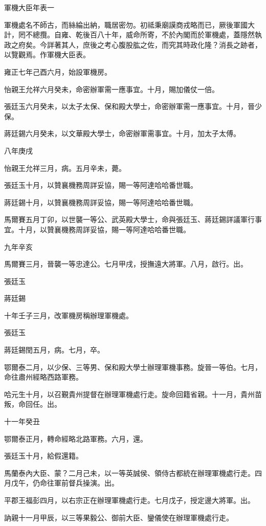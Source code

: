 
\begin{pinyinscope}
軍機大臣年表一

軍機處名不師古，而絲綸出納，職居密勿。初祗秉廟謨商戎略而已，厥後軍國大計，罔不總攬。自雍、乾後百八十年，威命所寄，不於內閣而於軍機處，蓋隱然執政之府矣。今詳著其人，庶後之考心腹股肱之佐，而究其時政化隆？消長之跡者，以覽觀焉。作軍機大臣表。

雍正七年己酉六月，始設軍機房。

怡親王允祥六月癸未，命密辦軍需一應事宜。十月，賜加儀仗一倍。

張廷玉六月癸未，以太子太保、保和殿大學士，命密辦軍需一應事宜。十月，晉少保。

蔣廷錫六月癸未，以文華殿大學士，命密辦軍需事宜。十月，加太子太傅。

八年庚戌

怡親王允祥三月，病。五月辛未，薨。

張廷玉十月，以贊襄機務周詳妥協，賜一等阿達哈哈番世職。

蔣廷錫十月，以贊襄機務周詳妥協，賜一等阿達哈哈番世職。

馬爾賽五月丁卯，以世襲一等公、武英殿大學士，命與張廷玉、蔣廷錫詳議軍行事宜。十月，以贊襄機務周詳妥協，賜一等阿達哈哈番世職。

九年辛亥

馬爾賽三月，晉襲一等忠達公。七月甲戌，授撫遠大將軍。八月，啟行。出。

張廷玉

蔣廷錫

十年壬子三月，改軍機房稱辦理軍機處。

張廷玉

蔣廷錫閏五月，病。七月，卒。

鄂爾泰二月，以少保、三等男、保和殿大學士辦理軍機事務。旋晉一等伯。七月，命往肅州經略西路軍務。

哈元生十月，以召覲貴州提督在辦理軍機處行走。旋命回籍省親。十一月，貴州苗叛，命回任。出。

十一年癸丑

鄂爾泰正月，轉命經略北路軍務。六月，還。

張廷玉十月，給假還籍。

馬蘭泰內大臣、蒙？二月己未，以一等英誠侯、領侍古都統在辦理軍機處行走。四月戊午，仍命往軍前督兵操演。出。

平郡王福彭四月，以右宗正在辦理軍機處行走。七月戊子，授定邊大將軍。出。

訥親十一月甲辰，以三等果毅公、御前大臣、鑾儀使在辦理軍機處行走。


\end{pinyinscope}
